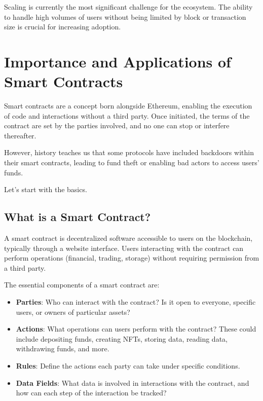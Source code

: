 Scaling is currently the most significant challenge for the ecosystem. The ability to handle high volumes of users without being limited by block or transaction size is crucial for increasing adoption.

\newpage


\section{Importance and Applications of Smart Contracts}

Smart contracts are a concept born alongside Ethereum, enabling the execution of code and interactions without a third party. Once initiated, the terms of the contract are set by the parties involved, and no one can stop or interfere thereafter.

However, history teaches us that some protocols have included backdoors within their smart contracts, leading to fund theft or enabling bad actors to access users' funds.

Let's start with the basics.

\subsection{What is a Smart Contract?}

A smart contract is decentralized software accessible to users on the blockchain, typically through a website interface. Users interacting with the contract can perform operations (financial, trading, storage) without requiring permission from a third party.

The essential components of a smart contract are:

\begin{itemize}
\item \textbf{Parties}: Who can interact with the contract? Is it open to everyone, specific users, or owners of particular assets?
\item \textbf{Actions}: What operations can users perform with the contract? These could include depositing funds, creating NFTs, storing data, reading data, withdrawing funds, and more.
\item \textbf{Rules}: Define the actions each party can take under specific conditions.
\item \textbf{Data Fields}: What data is involved in interactions with the contract, and how can each step of the interaction be tracked?
\end{itemize}

